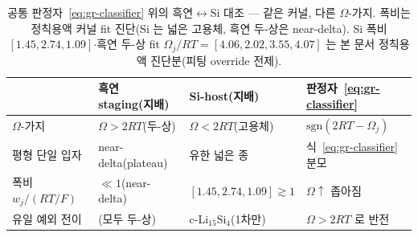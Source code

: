 \begin{table}[t]
\centering\footnotesize
\renewcommand{\arraystretch}{1.3}
\caption{공통 판정자~\eqref{eq:gr-classifier} 위의 흑연$\leftrightarrow$Si 대조 --- 같은 커널, 다른 $\Omega$-가지.
폭비는 정칙용액 커널 fit 진단(Si 는 넓은 고용체, 흑연 두-상은 near-delta). Si 폭비 $[1.45,2.74,1.09]$$\cdot$흑연
두-상 fit $\Omega_j/RT{=}[4.06,2.02,3.55,4.07]$ 는 본 문서 정칙용액 진단분(피팅 override 전제).}
\label{tab:si-frumkin-contrast}
\begin{tabular}{@{}l l l l@{}}
\toprule
 & 흑연 staging(지배) & Si-host(지배) & 판정자~\eqref{eq:gr-classifier} \\
\midrule
$\Omega$-가지        & $\Omega>2RT$(두-상)          & $\Omega<2RT$(고용체)          & $\mathrm{sgn}(2RT-\Omega_j)$ \\
평형 단일 입자       & near-delta(plateau)          & 유한 넓은 종                  & 식~\eqref{eq:gr-classifier} 분모 \\
폭비 $w_j/(RT/F)$    & $\ll1$(near-delta)           & $[1.45,2.74,1.09]\gtrsim1$    & $\Omega\!\uparrow$ 좁아짐 \\
유일 예외 전이       & (모두 두-상)                  & c-Li$_{15}$Si$_4$(1차만)      & $\Omega>2RT$ 로 반전 \\
\bottomrule
\end{tabular}
\end{table}

